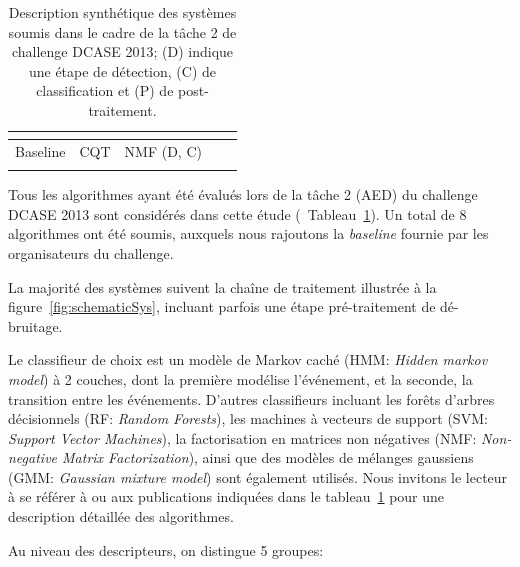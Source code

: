 \begin{table}[t]
\begin{center}
\begin{tabular}{lcccc}
\citep{VVK,gemmeke2013exemplar}     &                      &                              &           &             \\    
\hline
Baseline                            & CQT                  & NMF \hfill  (D, C)           &           &             \\ 
\citep{Giannoulis:2013a}            &                      &                              &           &             \\  
\hline      
\end{tabular}
\end{center}
\caption[Description synthétique des systèmes soumis dans le cadre de la tâche 2 de challenge DCASE 2013.]{Description synthétique des systèmes soumis dans le cadre de la tâche 2 de challenge DCASE 2013; (D) indique une étape de détection, (C) de classification et (P) de post-traitement.}
\label{tab:systemsDcase2013}
\end{table}

Tous les algorithmes ayant été évalués lors de la tâche 2 (AED) du challenge DCASE 2013 sont considérés dans cette étude (\cf~Tableau~\ref{tab:systemsDcase2013}). Un total de 8 algorithmes ont été soumis, auxquels nous rajoutons la \emph{baseline} fournie par les organisateurs du challenge.

La majorité des systèmes suivent la chaîne de traitement illustrée à la figure~\ref{fig:schematicSys}, incluant parfois une étape pré-traitement de dé-bruitage.

Le classifieur de choix est un modèle de Markov caché (HMM: \emph{Hidden markov model}) \citep{Rabiner1989} à 2 couches, dont la première modélise l'événement, et la seconde, la transition entre les événements. D'autres classifieurs incluant les forêts d'arbres décisionnels (RF: \emph{Random Forests}), les machines à vecteurs de support (SVM: \emph{Support Vector Machines}), la factorisation en matrices non négatives (NMF: \emph{Non-negative Matrix Factorization}), ainsi que des modèles de mélanges gaussiens (GMM: \emph{Gaussian mixture model}) sont également utilisés. Nous invitons le lecteur à se référer à \citep{Stowell15} ou aux publications indiquées dans le tableau~\ref{tab:systemsDcase2013} pour une description détaillée des algorithmes.

Au niveau des descripteurs, on distingue 5 groupes:

